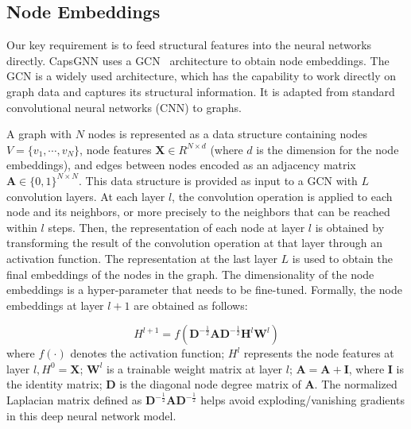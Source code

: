 \appendix

\subsection{Node Embeddings} \label{app:a}

Our key requirement is to
    feed structural features into the neural networks directly. CapsGNN
    uses a GCN~\cite{Kipf:LCLR17} architecture to obtain node
    embeddings. The GCN is a widely used  architecture,
    which has the capability to work directly on graph data and captures its
    structural information. It is adapted from standard convolutional neural networks (CNN) to graphs.

     A graph with $N$ nodes is represented as a data structure
     containing nodes $V=\{v_1,\cdots,v_N\}$, node
     features $\textbf{X}\in R^{N\times d}$ (where $d$ is the dimension for the node embeddings), and edges
     between nodes encoded as an adjacency matrix $\textbf{A}\in \{0, 1\}^{N \times N}.$ This data structure is provided as input to a GCN with  $L$ convolution layers. At each layer $l$, the convolution operation is applied to each node and its neighbors, or more precisely to the neighbors that can be reached within $l$ steps. Then, the representation of each node at  layer $l$ is obtained by transforming the result of the convolution operation at that layer through an activation function. The  representation at the last layer $L$ is used to obtain the final  embeddings of the nodes in the graph. The dimensionality of the node embeddings is a hyper-parameter that needs to be fine-tuned.
    Formally, the node embeddings at layer $l+1$ are obtained as follows:

       \begin{equation}
        H^{l+1} = f\left({\textbf{D}}^{-\frac{1}{2}}{\textbf{A}}{\textbf{D}}^{-\frac{1}{2}}\textbf{H}^{l}\textbf{W}^{l}\right)
    \end{equation}
    \noindent
    where \(f\left(\cdot\right)\) denotes the activation function; \(H^{l}\) represents the node features at layer $l, H^{0} = \textbf{X}$; %
    \(\textbf{W}^{l}\) is a trainable weight matrix at layer \(l\); \({\textbf{A}}=\textbf{A} + \textbf{I}\), where \(\textbf{I}\) is the identity matrix; %
    \(\textbf{D}\) is the diagonal node degree matrix of \({\textbf{A}}\). The normalized Laplacian matrix defined as \({\textbf{D}}^{-\frac{1}{2}}{\textbf{A}}{\textbf{D}}^{-\frac{1}{2}}\)  helps avoid exploding/vanishing gradients in this deep neural network model.


